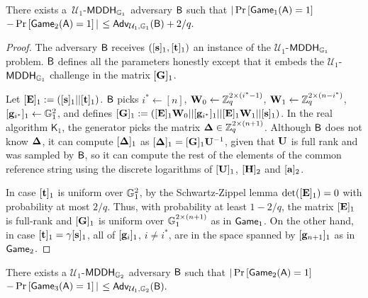 \begin{lemma} There exists a~$\mathcal{U}_1$-$\mathsf{MDDH}_{\mathbb{G}_1}$ adversary $\mathsf{B}$ such that
$|\Pr\left[\mathsf{Game}_{1}(\mathsf{A})=1\right]$ $-\Pr\left[\mathsf{Game}_{2}(\mathsf{A})=1\right]|$ $\leq
    \mathsf{Adv}_{\mathcal{U}_1,\mathbb{G}_1}(\mathsf{B}) + 2/q.$
\label{lemma:bits2}
\end{lemma}
\begin{proof}
The adversary $\mathsf{B}$ receives $([\mathbf{s}]_1, [\mathbf{t}]_1)$ an instance of the $\mathcal{U}_1$-$\mathsf{MDDH}_{\mathbb{G}_1}$ problem.
$\mathsf{B}$ defines all the parameters honestly except that
it embeds the $\mathcal{U}_1$-$\mathsf{MDDH}_{\mathbb{G}_1}$ challenge in the matrix 
$[\mathbf{{G}}]_1$.

Let $[\mathbf{{E}}]_1:=([\mathbf{s}]_1||[\mathbf{t}]_1)$. $\mathsf{B}$ picks $i^*\gets[n]$, $\mathbf{{W}}_0\gets\mathbb{Z}_q^{2\times(i^*-1)}$,
$\mathbf{{W}}_1\gets\mathbb{Z}_q^{2\times(n-i^*)}$,
$[\mathbf{g}_{i^*}]_1\gets\mathbb{G}_1^{2}$,
and defines $[\mathbf{{G}}]_1 := ([\mathbf{{E}}]_1\mathbf{{W}}_0||[\mathbf{g}_{i^*}]_1||[\mathbf{{E}}]_1\mathbf{{W}}_1|| [\mathbf{s}]_1)$. 
In the real algorithm $\mathsf{K}_1$, the generator picks the matrix $\mathbf{{\Delta}} \in \mathbb{Z}_q^{2 \times (n+1)}$.
Although $\mathsf{B}$ does not know $\mathbf{{\Delta}}$,  it can compute $[\mathbf{{\Delta}}]_1$ as $[\mathbf{{\Delta}}]_1= [\mathbf{{G}}]_1\mathbf{{U}}^{-1}$,
given that $\mathbf{{U}}$ is full rank and was  sampled 
by $\mathsf{B}$, so it can compute the rest of the elements of the
common reference string  using the discrete logarithms of $[\mathbf{{U}}]_1$, $[{\mathbf{{H}}}]_2$ and $[\mathbf{a}]_2$.  

In case $[\mathbf{t}]_1$ is uniform over $\mathbb{G}_1^{2}$, by the Schwartz-Zippel lemma $\det([\mathbf{{E}}]_1) = 0$ with probability at most $2/q$.
Thus, with probability at least $1-2/q$, the matrix $[\mathbf{{E}}]_1$ is full-rank and $[\mathbf{{G}}]_1$ is uniform over $\mathbb{G}_1^{2\times(n+1)}$ as in
$\mathsf{Game}_1$.
On the other hand, in case $[\mathbf{t}]_1=\gamma [\mathbf{s}]_1$, all of $[\mathbf{g}_{i}]_1$, $i\neq i^*$, are in the space
spanned by $[\mathbf{g}_{n+1}]_1$ as in $\mathsf{Game}_2$.
\end{proof}

\begin{lemma} There exists a $\mathcal{U}_1$-$\mathsf{MDDH}_{\mathbb{G}_2}$ adversary $\mathsf{B}$ such that
$|\Pr\left[\mathsf{Game}_{2}(\mathsf{A})=1\right]$ $-\Pr\left[\mathsf{Game}_{3}(\mathsf{A})=1\right]|$ $\leq
\mathsf{Adv}_{\mathcal{U}_1,\mathbb{G}_2}(\mathsf{B}).$
\label{lemma:bits3}
\end{lemma}

